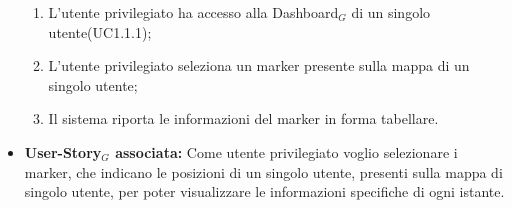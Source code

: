 \documentclass[11pt]{article}
\begin{document}
\begin{justify}
\begin{itemize}
        \begin{enumerate}
            \item L'utente privilegiato ha accesso alla Dashboard$_G$ di un singolo utente(UC1.1.1);
            \item L'utente privilegiato seleziona un marker presente sulla mappa di un singolo utente;
            \item Il sistema riporta le informazioni del marker in forma tabellare.
        \end{enumerate}
     \item \textbf{User-Story$_G$ associata:}
       Come utente privilegiato voglio selezionare i marker, che indicano le posizioni di un singolo utente, presenti sulla mappa di singolo utente, per poter visualizzare le informazioni specifiche di ogni istante.
\end{itemize}


\end{justify}
\end{document}
